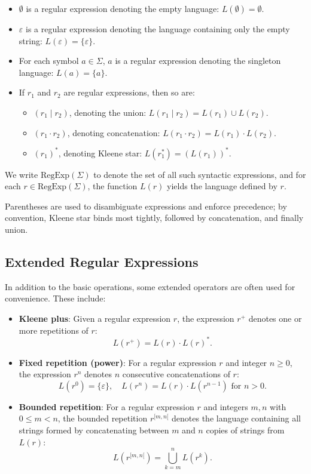 \begin{itemize}
    \item $\emptyset$ is a regular expression denoting the empty language: $L(\emptyset) = \emptyset$.
    \item $\varepsilon$ is a regular expression denoting the language containing only the empty string: $L(\varepsilon) = \{ \varepsilon \}$.
    \item For each symbol $a \in \Sigma$, $a$ is a regular expression denoting the singleton language: $L(a) = \{ a \}$.
    \item If $r_1$ and $r_2$ are regular expressions, then so are:
    \begin{itemize}
        \item $(r_1 \mid r_2)$, denoting the union: $L(r_1 \mid r_2) = L(r_1) \cup L(r_2)$.
        \item $(r_1 \cdot r_2)$, denoting concatenation: $L(r_1 \cdot r_2) = L(r_1) \cdot L(r_2)$.
        \item $(r_1)^*$, denoting Kleene star: $L(r_1^*) = (L(r_1))^*$.
    \end{itemize}
\end{itemize}
We write $\text{RegExp}(\Sigma)$ to denote the set of all such syntactic expressions, and for each $r \in \text{RegExp}(\Sigma)$, the function $L(r)$ yields the language defined by $r$.

\medskip

Parentheses are used to disambiguate expressions and enforce precedence; by convention, Kleene star binds most tightly, followed by concatenation, and finally union.

\subsection{Extended Regular Expressions}
In addition to the basic operations, some extended operators are often used for convenience. These include:

\begin{itemize}
    \item \textbf{Kleene plus}: Given a regular expression $r$, the expression $r^+$ denotes one or more repetitions of $r$:
    \[
    L(r^+) = L(r) \cdot L(r)^*.
    \]

    \item \textbf{Fixed repetition (power)}: For a regular expression $r$ and integer $n \geq 0$, the expression $r^n$ denotes $n$ consecutive concatenations of $r$:
    \[
    L(r^0) = \{ \varepsilon \}, \quad L(r^n) = L(r) \cdot L(r^{n-1}) \text{ for } n > 0.
    \]

	 \item \textbf{Bounded repetition}: For a regular expression $r$ and integers $m, n$ with $0 \leq m < n$, the bounded repetition $r^{[m,n[}$ denotes the language containing all strings formed by concatenating between $m$ and $n$ copies of strings from $L(r)$:
    \[
    L(r^{[m,n[}) = \bigcup_{k=m}^{n} L(r^k).
    \]
\end{itemize}

